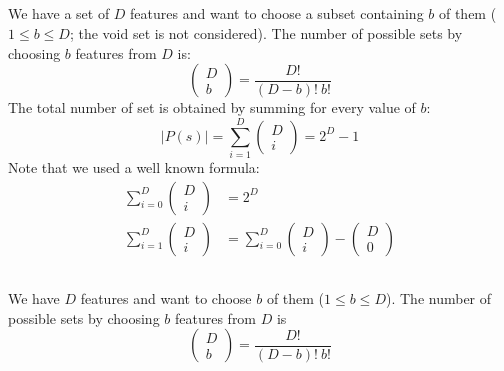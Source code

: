 \subsection{}
We have a set of $D$ features and want to choose a subset containing $b$ of them ($1\leq b\leq D$; the void set is not considered). The number of possible sets by choosing $b$ features from $D$ is:
\begin{equation*}
    \left(\begin{array}{c}D\\ b \end{array}\right)=\frac{D!}{(D-b)!\ b!}
\end{equation*}
The total number of set is obtained by summing for every value of $ b $:
\begin{equation*}
    |P(s)|=\sum_{i=1}^{D}\left(\begin{array}{c}D\\ i\end{array}\right)=2^{D}-1
\end{equation*}
Note that we used a well known formula:
\begin{align*}
    \sum_{i=0}^{D}\left(\begin{array}{c}D\\ i\end{array}\right)&=2^{D} \\
    \sum_{i=1}^{D}\left(\begin{array}{c}D\\ i\end{array}\right)
    &=\sum_{i=0}^{D}\left(\begin{array}{c}D\\ i\end{array}\right)-\left(\begin{array}{c}D\\ 0\end{array}\right)
\end{align*}

\subsection{}
We have $ D $ features and want to choose $ b $ of them ($1\leq b\leq D$). The number of possible sets by choosing $ b $ features from $ D $ is
\begin{equation*}
    \left(\begin{array}{c}D\\ b\end{array}\right)=\frac{D!}{(D-b)!\ b!}
\end{equation*}

